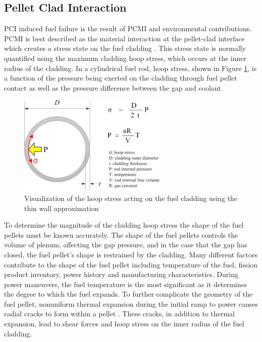 \documentclass[edeposit,fullpage,11pt]{uiucthesis2009}
\begin{document}
\subsection{Pellet Clad Interaction}

\gls{PCI} induced fuel failure is the result of \gls{PCMI} and environmental contributions.
\gls{PCMI} is best described as the material interaction at the pellet-clad interface which creates a stress state on the fuel cladding \cite{kennard_pci_2016}.
This stress state is normally quantified using the maximum cladding hoop stress, which occurs at the inner radius of the cladding.
In a cylindrical fuel rod, hoop stress, shown in Figure \ref{fig:hoop_stress_cite}, is a function of the pressure being exerted on the cladding through fuel pellet contact as well as the pressure difference between the gap and coolant.

\begin{figure}
\begin{center}
\includegraphics[width=0.5\linewidth]{./Figures/hoop_stress_cite.jpg}
\caption{Visualization of the hoop stress acting on the fuel cladding using the thin wall approximation \cite{kook_review_2013}}
\label{fig:hoop_stress_cite}
\end{center}
\end{figure}

To determine the magnitude of the cladding hoop stress the shape of the fuel pellets must be known accurately.
The shape of the fuel pellets controls the volume of plenum, affecting the gap pressure, and in the case that the gap has closed, the fuel pellet's shape is restrained by the cladding. 
Many different factors contribute to the shape of the fuel pellet including temperature of the fuel, fission product inventory, power history and manufacturing characteristics.
During power maneuvers, the fuel temperature is the most significant as it determines the degree to which the fuel expands.
To further complicate the geometry of the fuel pellet, nonuniform thermal expansion during the initial ramp to power causes radial cracks to form within a pellet \cite{capps_evaluation_2016}.
These cracks, in addition to thermal expansion, lead to shear forces and hoop stress on the inner radius of the fuel cladding.
  
\end{document}
